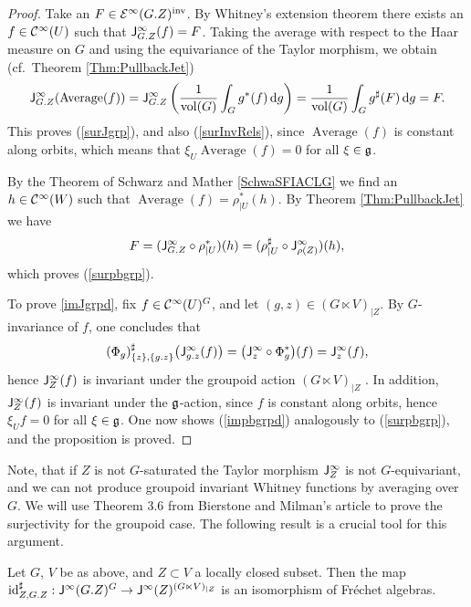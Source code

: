 \begin{proof} Take an $F\in\mathcal{E}^\infty(G.Z)^\textup{inv}$. By Whitney's extension theorem 
there exists an $f\in \mathcal{C}^\infty(U)$ such that $ \mathsf{J}^\infty_{G.Z}(f)=F$.
Taking the average with respect to the Haar measure on $G$ and using the equivariance of 
the Taylor morphism, we obtain (cf.~Theorem \ref{Thm:PullbackJet})
\begin{eqnarray*}
\mathsf{J}^\infty_{G.Z}(\operatorname{Average}(f))=\mathsf{J}^\infty_{G.Z}\left(\frac{1}{\operatorname{vol}(G)}\int_G g^*(f) \,
\mathrm{d}g  \right)=\frac{1}{\operatorname{vol}(G)}\int_G g^{\sharp}(F)\, \mathrm{d}g =F.
\end{eqnarray*}
This proves (\ref{surJgrp}), and also (\ref{surInvRels}), since 
$\operatorname{Average}(f)$ is constant along orbits, which means that 
$\xi_U\operatorname{Average}(f)=0$ for all $\xi\in \mathfrak{g}$.

By the Theorem of Schwarz and Mather \ref{SchwaSFIACLG} we find an 
$h\in \mathcal{C}^\infty(W)$ such that $\operatorname{Average}(f)=\rho_{|U}^*(h)$. By Theorem \ref{Thm:PullbackJet} we have
\[F=(\mathsf{J}^\infty_{G.Z}\circ \rho_{|U}^*)(h)=(\rho_{|U}^{\sharp}\circ\mathsf{J}^\infty_{\rho(Z)})(h), \]
which proves (\ref{surpbgrp}).

To prove \ref{imJgrpd}, fix $f\in  \mathcal{C}^\infty(U)^G$, and let $(g,z) \in (G\ltimes V)_{|Z}$. By $G$-invariance of 
$f$, one concludes that 
\[
  (\Phi_g)^{\sharp}_{\{z\},\{g.z\}}\big( \mathsf{J}^\infty_{g.z} (f) \big) = \big (\mathsf{J}^\infty_{z} \circ \Phi_g^* \big) (f) =
  \mathsf{J}^\infty_{z} (f) ,
\]
hence  $\mathsf{J}^\infty_{Z} (f)$ is invariant under the groupoid action $(G\ltimes V)_{|Z}$ . 
In addition, $\mathsf{J}^\infty_{Z} (f)$ is invariant under the $\mathfrak{g}$-action, since 
$f$ is constant along orbits, hence $\xi_U f =0$ for all $\xi\in \mathfrak{g}$.
One now shows (\ref{impbgrpd})  analogously to (\ref{surpbgrp}), and the proposition is proved.
\end{proof}

Note, that if $Z$ is not $G$-saturated the Taylor morphism $\mathsf{J}^\infty_{Z}$ is not $G$-equivariant, and we 
can not produce groupoid invariant Whitney functions by averaging over $G$. 
We will use Theorem 3.6 from Bierstone and Milman's article \cite{BieMilCDF} to prove 
the surjectivity for the groupoid case. The following result is a crucial tool  for this argument.

\begin{proposition} \label{idiso} 
Let $G$, $V$ be as above, and $Z\subset V$ a locally closed subset. Then the  map 
$\operatorname{id}^{\sharp}_{Z,G.Z}: \mathsf{J}^\infty(G.Z)^G\to \mathsf{J}^\infty(Z)^{(G\ltimes V)_{|Z}}$ 
is an isomorphism of Fr{\'e}chet algebras.
\end{proposition}

